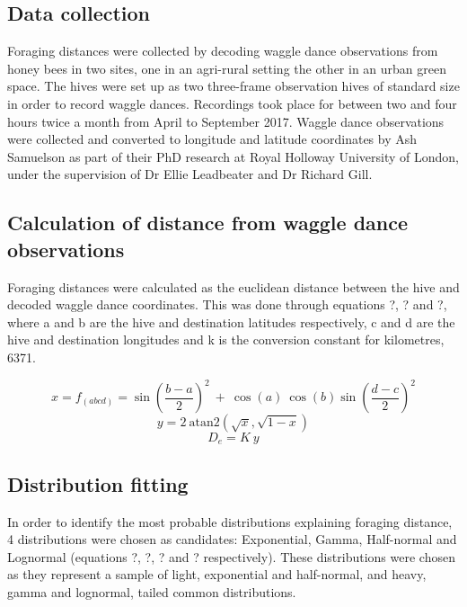 \documentclass[11pt,usenames,dvipsnames]{article}
\begin{document}
\subsection{Data collection}
Foraging distances were collected by decoding waggle dance observations from honey bees in two sites, one in an agri-rural setting the other in an urban green space. The hives were set up as two three-frame observation hives of standard size in order to record waggle dances. Recordings took place for between two and four hours twice a month from April to September 2017. Waggle dance observations were collected and converted to longitude and latitude coordinates by Ash Samuelson as part of their PhD research at Royal Holloway University of London, under the supervision of Dr Ellie Leadbeater and Dr Richard Gill.

\subsection{Calculation of distance from waggle dance observations}
Foraging distances were calculated as the euclidean distance between the hive and decoded waggle dance coordinates. This was done through equations ?, ? and ?, where a and b are the hive and destination latitudes respectively, c and d are the hive and destination longitudes and k is the conversion constant for kilometres, 6371.

\begin{equation}
x = f_{(abcd)} = \sin\left(\frac{b - a}{2}\right)^2\ +\ \cos(a)\ \cos(b) \sin\left(\frac{d - c}{2}\right)^2 
\end{equation}
\begin{equation}
y = 2\ \text{atan2}(\sqrt{x}, \sqrt{1 - x})
\end{equation}
\begin{equation}
D_e = K\ y
\end{equation}

\subsection{Distribution fitting}

In order to identify the most probable distributions explaining foraging distance, 4 distributions were chosen as candidates: Exponential, Gamma, Half-normal and Lognormal (equations ?, ?, ? and ? respectively). These distributions were chosen as they represent a sample of light, exponential and half-normal, and heavy, gamma and lognormal, tailed common distributions.
\end{document}
